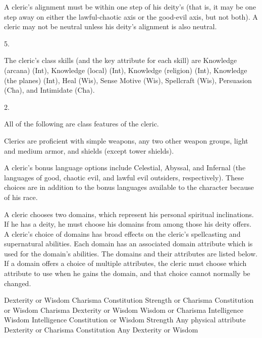  A cleric's alignment must be within one step of his deity's (that is, it may be one step away on either the lawful-chaotic axis or the good-evil axis, but not both). A cleric may not be neutral unless his deity's alignment is also neutral.

 5.

The cleric's class skills (and the key attribute for each skill) are Knowledge (arcana) (Int), Knowledge (local) (Int), Knowledge (religion) (Int), Knowledge (the planes) (Int), Heal (Wis), Sense Motive (Wis), Spellcraft (Wis), Persuasion (Cha), and Intimidate (Cha).

 2.

All of the following are class features of the cleric.

  Clerics are proficient with simple weapons, any two other weapon groups, light and medium armor, and shields (except tower shields).

 A cleric's bonus language options include Celestial, Abyssal, and Infernal (the languages of good, chaotic evil, and lawful evil outsiders, respectively). These choices are in addition to the bonus languages available to the character because of his race.

 A cleric chooses two domains, which represent his personal spiritual inclinations. If he has a deity, he must choose his domains from among those his deity offers. A cleric's choice of domains has broad effects on the cleric's spellcasting and supernatural abilities. Each domain has an associated domain attribute which is used for the domain's abilities. The domains and their attributes are listed below. If a domain offers a choice of multiple attributes, the cleric must choose which attribute to use when he gains the domain, and that choice cannot normally be changed.

 Dexterity or Wisdom
 Charisma
 Constitution
 Strength or Charisma
 Constitution or Wisdom
 Charisma
 Dexterity or Wisdom
 Wisdom or Charisma
 Intelligence
 Wisdom
 Intelligence
 Constitution or Wisdom
 Strength
 Any physical attribute
 Dexterity or Charisma
 Constitution
 Any 
 Dexterity or Wisdom


